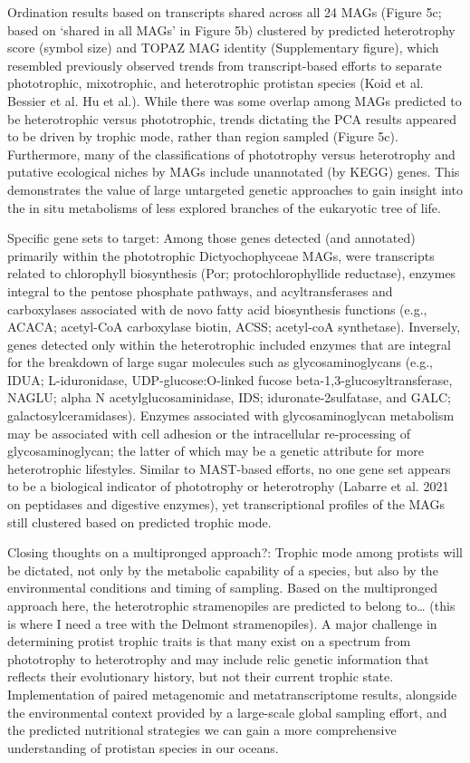 \documentclass[12pt]{article}
\numberwithin{equation}{section}
\begin{document}
Ordination results based on transcripts shared across all 24 MAGs (Figure 5c; based on ‘shared in all MAGs’ in Figure 5b) clustered by predicted heterotrophy score (symbol size) and TOPAZ MAG identity (Supplementary figure), which resembled previously observed trends from transcript-based efforts to separate phototrophic, mixotrophic, and heterotrophic protistan species (Koid et al. Bessier et al. Hu et al.). While there was some overlap among MAGs predicted to be heterotrophic versus phototrophic, trends dictating the PCA results appeared to be driven by trophic mode, rather than region sampled (Figure 5c). Furthermore, many of the classifications of phototrophy versus heterotrophy and putative ecological niches by MAGs include unannotated (by KEGG) genes. This demonstrates the value of large untargeted genetic approaches to gain insight into the in situ metabolisms of less explored branches of the eukaryotic tree of life. 

Specific gene sets to target: Among those genes detected (and annotated) primarily within the phototrophic Dictyochophyceae MAGs, were transcripts related to chlorophyll biosynthesis (Por; protochlorophyllide reductase), enzymes integral to the pentose phosphate pathways, and acyltransferases and carboxylases associated with de novo fatty acid biosynthesis functions (e.g., ACACA; acetyl-CoA carboxylase biotin, ACSS; acetyl-coA synthetase). Inversely, genes detected only within the heterotrophic included enzymes that are integral for the breakdown of large sugar molecules such as glycosaminoglycans (e.g., IDUA; L-iduronidase, UDP-glucose:O-linked fucose beta-1,3-glucosyltransferase, NAGLU; alpha N acetylglucosaminidase, IDS; iduronate-2sulfatase, and GALC; galactosylceramidases). Enzymes associated with glycosaminoglycan metabolism may be associated with cell adhesion or the intracellular re-processing of glycosaminoglycan; the latter of which may be a genetic attribute for more heterotrophic lifestyles. 
Similar to MAST-based efforts, no one gene set appears to be a biological indicator of phototrophy or heterotrophy (Labarre et al. 2021 on peptidases and digestive enzymes), yet transcriptional profiles of the MAGs still clustered based on predicted trophic mode. 

Closing thoughts on a multipronged approach?: Trophic mode among protists will be dictated, not only by the metabolic capability of a species, but also by the environmental conditions and timing of sampling. Based on the multipronged approach here, the heterotrophic stramenopiles are predicted to belong to… (this is where I need a tree with the Delmont stramenopiles). A major challenge in determining protist trophic traits is that many exist on a spectrum from phototrophy to heterotrophy and may include relic genetic information that reflects their evolutionary history, but not their current trophic state. Implementation of paired metagenomic and metatranscriptome results, alongside the environmental context provided by a large-scale global sampling effort, and the predicted nutritional strategies we can gain a more comprehensive understanding of protistan species in our oceans.
\end{document}
